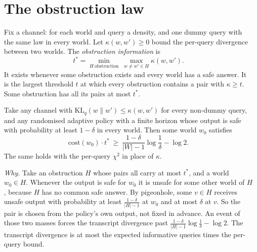 
\section{The obstruction law}
\label{sec:law}

Fix a channel: for each world and query a density, and one dummy query with the same law in
every world. Let $\kappa(w,w')\ge0$ bound the per-query divergence between two worlds. The
\emph{obstruction information} is
\[
t^{*}=\min_{H\ \text{obstruction}}\ \max_{w\ne w'\in H}\kappa(w,w').
\]
It exists whenever some obstruction exists and every world has a safe answer. It is the largest
threshold $t$ at which every obstruction contains a pair with $\kappa\ge t$. Some obstruction
has all its pairs at most $t^{*}$.


\begin{theorem}
\label{thm:lower}
Take any channel with $\mathrm{KL}_{q}(w\|w')\le\kappa(w,w')$ for every non-dummy query, and
any randomised adaptive policy with a finite horizon whose output is safe with probability at
least $1-\delta$ in every world. Then some world $w_{0}$ satisfies
\[
\mathrm{cost}(w_{0})\cdot t^{*}\ \ge\ \frac{1-\delta}{|W|-1}\log\frac1\delta-\log2 .
\]
The same holds with the per-query $\chi^{2}$ in place of $\kappa$.
\end{theorem}


\emph{Why.} Take an obstruction $H$ whose pairs all carry at most $t^{*}$, and a world
$w_{0}\in H$. Whenever the output is safe for $w_{0}$ it is unsafe for some other world of $H$,
because $H$ has no common safe answer. By pigeonhole, some $v\in H$ receives unsafe output with
probability at least $\frac{1-\delta}{|H|-1}$ at $w_{0}$ and at most $\delta$ at $v$. So the pair
is chosen from the policy's own output, not fixed in advance. An event of those two masses
forces the transcript divergence past $\frac{1-\delta}{|H|-1}\log\frac1\delta-\log2$. The
transcript divergence is at most the expected informative queries times the per-query bound.

